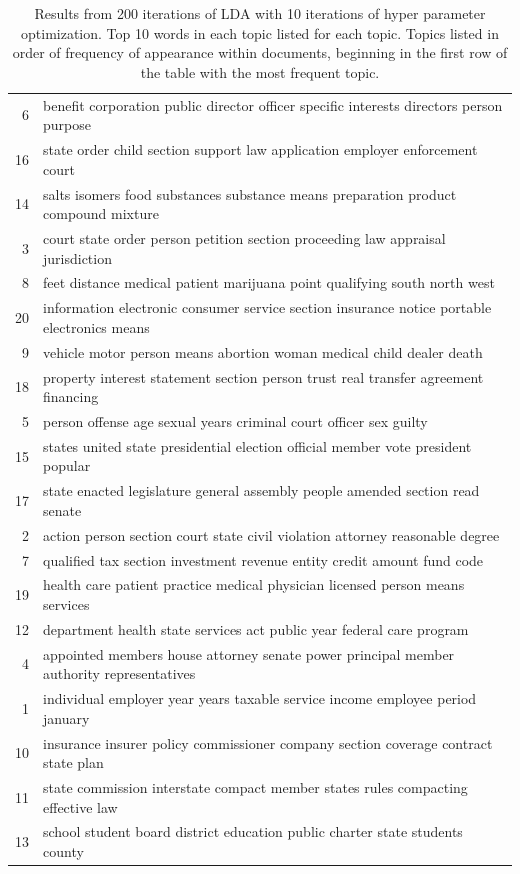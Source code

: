 \documentclass[12pt]{article} %
\begin{document}
\begin{table}[ht]
\centering
\begin{tabular}{rl}
  \hline
  \hline
6 & benefit corporation public director officer specific interests directors person purpose \\ 
  16 & state order child section support law application employer enforcement court \\ 
  14 & salts isomers food substances substance means preparation product compound mixture \\ 
  3 & court state order person petition section proceeding law appraisal jurisdiction \\ 
  8 & feet distance medical patient marijuana point qualifying south north west \\ 
  20 & information electronic consumer service section insurance notice portable electronics means \\ 
  9 & vehicle motor person means abortion woman medical child dealer death \\ 
  18 & property interest statement section person trust real transfer agreement financing \\ 
  5 & person offense age sexual years criminal court officer sex guilty \\ 
  15 & states united state presidential election official member vote president popular \\ 
  17 & state enacted legislature general assembly people amended section read senate \\ 
  2 & action person section court state civil violation attorney reasonable degree \\ 
  7 & qualified tax section investment revenue entity credit amount fund code \\ 
  19 & health care patient practice medical physician licensed person means services \\ 
  12 & department health state services act public year federal care program \\ 
  4 & appointed members house attorney senate power principal member authority representatives \\ 
  1 & individual employer year years taxable service income employee period january \\ 
  10 & insurance insurer policy commissioner company section coverage contract state plan \\ 
  11 & state commission interstate compact member states rules compacting effective law \\ 
  13 & school student board district education public charter state students county \\ 
   \hline
\end{tabular}
\caption{Results from 200 iterations of LDA with 10 iterations of hyper parameter optimization. Top 10 words in each topic listed for each topic. Topics listed in order of frequency of appearance within documents, beginning in the first row of the table with the most frequent topic.}
\label{tab:topics}
\end{table}
\end{document}
